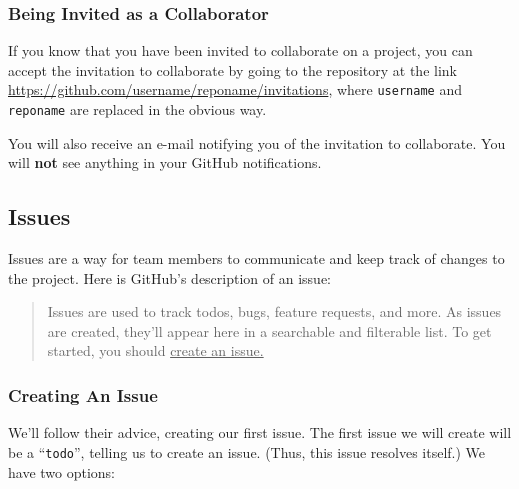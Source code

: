 \documentclass[11pt]{article}
\begin{document}
\subsubsection{Being Invited as a Collaborator}

If you know that you have been invited to collaborate on a project, you can accept the invitation to collaborate by going to the repository at the link \url{https://github.com/username/reponame/invitations}, where \texttt{username} and \texttt{reponame} are replaced in the obvious way. 

You will also receive an e-mail notifying you of the invitation to collaborate. You will \textbf{not} see anything in your GitHub notifications. 

\hypertarget{issues-section}{\subsection{Issues}}

Issues are a way for team members to communicate and keep track of changes to the project.  Here is GitHub's description of an issue:~\cite{github-issues} \\

\begin{quote}
Issues are used to track todos, bugs, feature requests, and more. As issues are created, they'll appear here in a searchable and filterable list. To get started, you should \underline{create an issue.}
\end{quote} 

\subsubsection{Creating An Issue}
We'll follow their advice, creating our first issue. The first issue we will create will be a ``\texttt{todo}'', telling us to create an issue. (Thus, this issue resolves itself.) We have two options: 
\end{document}
